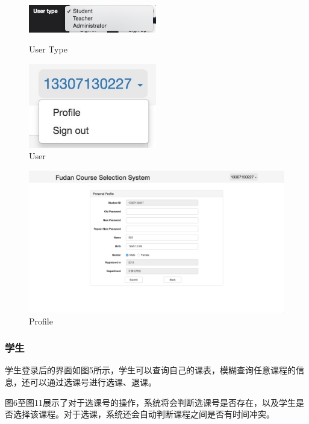 \documentclass[a4paper, 11pt, nofonts, nocap, fancyhdr]{ctexart}
\begin{document}
	\begin{figure}[ht]
		\begin{minipage}{0.5\textwidth}
			\centering
			\includegraphics[width=2.2in]{usertype}
			\caption{User Type}
		\end{minipage}%
		\begin{minipage}{0.5\textwidth}
			\centering
			\includegraphics[width=2.2in]{user}
			\caption{User}
		\end{minipage}
	\end{figure}

	\begin{figure}[ht]
		\centering
		\includegraphics[width=6in]{stupro}
		\caption{Profile}
	\end{figure}

\newpage
\subsubsection{学生}

	学生登录后的界面如图5所示，学生可以查询自己的课表，模糊查询任意课程的信息，还可以通过选课号进行选课、退课。

	图6至图11展示了对于选课号的操作，系统将会判断选课号是否存在，以及学生是否选择该课程。对于选课，系统还会自动判断课程之间是否有时间冲突。
\end{document}
